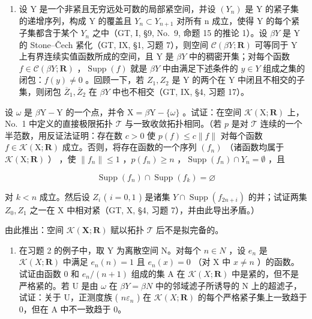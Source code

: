 \begin{enumerate}
\def\labelenumi{\arabic{enumi})}
\setcounter{enumi}{1}
\tightlist
\item
  设 Y 是一个非紧且无穷远处可数的局部紧空间，并设 \((Y_{n})\) 是 Y 的紧子集的递增序列，构成 Y 的覆盖且 \(Y_{n} \subset Y_{n+1}\) 对所有 n 成立，使得 Y 的每个紧子集都含于某个 \(Y_{n}\) 之中（GT, I, §9, No.~9, 命题 15 的推论 1）。设 \(\beta Y\) 是 Y 的 Stone--Čech 紧化（GT, IX, §1, 习题 7），则空间 \(\mathcal{C}(\beta Y; \mathbf{R})\) 可等同于 Y 上有界连续实值函数所成的空间，且 Y 是 \(\beta Y\) 中的稠密开集；对每个函数 \(f \in \mathcal{C}(\beta Y; \mathbf{R})\) ，\(\operatorname{Supp}(f)\) 就是 \(\beta Y\) 中由满足下述条件的 \(y \in Y\) 组成之集的闭包：\(f(y) \neq 0\) 。回顾一下，若 \(Z_{1}, Z_{2}\) 是 Y 的两个在 Y 中闭且不相交的子集，则闭包 \(\overline{Z}_{1}, \overline{Z}_{2}\) 在 \(\beta Y\) 中也不相交（GT, IX, §4, 习题 17）。
\end{enumerate}

设 \(\omega\) 是 \(\beta\mathrm{Y}-\mathrm{Y}\) 的一个点，并令 \(\mathrm{X}=\beta\mathrm{Y}-\{\omega\}\) 。试证：在空间 \(\mathcal{K}(\mathrm{X};\mathbf{R})\) 上，No.~1 中定义的直接极限拓扑 \(\mathcal{T}\) 与一致收敛拓扑相同。（若 \(p\) 是对 \(\mathcal{T}\) 连续的一个半范数，用反证法证明：存在数 \(c > 0\) 使 \(p(f) \leqslant c \| f \|\) 对每个函数 \(f \in \mathcal{K}(\mathrm{X};\mathbf{R})\) 成立。否则，将存在函数的一个序列 \((f_n)\) （诸函数均属于 \(\mathcal{K}(\mathrm{X};\mathbf{R})\) ） ，使 \(\| f_n \| \leqslant 1\) ，\(p(f_n) \geqslant n\) ，\(\operatorname{Supp}(f_n) \cap Y_n = \emptyset\) ，且

\[
\operatorname{Supp} (f _ {n}) \cap \operatorname{Supp} (f _ {k}) = \varnothing
\]

对 \(k < n\) 成立。然后设 \(Z_{i}\) ( \(i = 0,1\) ) 是诸集 \(Y \cap \operatorname{Supp}(f_{2n + i})\) 的并；试证两集 \(Z_{0}, Z_{1}\) 之一在 X 中相对紧（GT, X, §4, 习题 7），并由此导出矛盾。）

由此推出：空间 \(\mathcal{K}(\mathbf{X};\mathbf{R})\) 赋以拓扑 \(\mathcal{T}\) 后不是拟完备的。

\begin{enumerate}
\def\labelenumi{\arabic{enumi})}
\setcounter{enumi}{2}
\tightlist
\item
  在习题 2 的例子中，取 Y 为离散空间 N。对每个 \(n \in N\) ，设 \(e_n\) 是 \(\mathcal{K}(X; \mathbf{R})\) 中满足 \(e_n(n) = 1\) 且 \(e_n(x) = 0\) （对 X 中 \(x \neq n\) ）的函数。试证由函数 0 和 \(e_n/(n + 1)\) 组成的集 A 在 \(\mathcal{K}(X; \mathbf{R})\) 中是紧的，但不是严格紧的。若 U 是由 \(\omega\) 在 \(\beta Y = \beta N\) 中的邻域滤子所诱导的 N 上的超滤子，试证：关于 U，正测度族 ( \(n\varepsilon_n\) ) 在 \(\mathcal{K}(X; \mathbf{R})\) 的每个严格紧子集上一致趋于 0，但在 A 中不一致趋于 0。
\end{enumerate}

